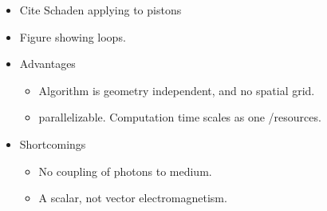 \begin{itemize}
\begin{itemize}
  \begin{equation}
    F = - \int \frac{dT}{T^{1+D/2}} \dlangle e^{-\cT\langle V\rangle} - 1\drangle,
  \end{equation}
  where $\cT$ is the loop proper time, $\langle V\rangle$ is the average of the potential around a particular loop, and $\dlangle\cdots\drangle$ denotes an ensemble average over Brownian paths.  
\item Typically take $V = \lambda\delta[\vect{x}-\sigma(\vect{x})]$, where $\sigma(\vect{x})=0$ is a function describing the surfaces.  In the limit $\lambda\rightarrow\infty$ this amounts to enforcing Dirichlet boundary conditions on the fields at the surfaces.  
\end{itemize}
\item Cite Schaden applying to pistons\cite{Schaden2009}
\item Figure showing loops.  
\item Advantages
  \begin{itemize}
  \item Algorithm is geometry independent, and no spatial grid.
  \item parallelizable.  Computation time scales as one /resources.  
  \end{itemize}

\item Shortcomings
\begin{itemize}
  \item No coupling of photons to medium.
  \item A scalar, not vector electromagnetism.
\end{itemize}
  
\end{itemize}


